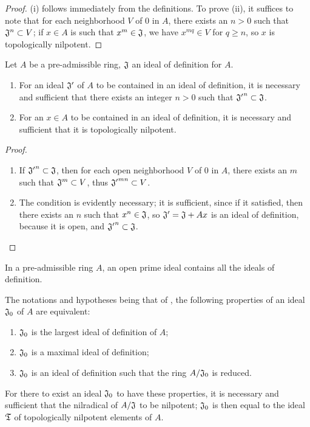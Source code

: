 \begin{proof}
\label{proof-0.7.1.3}
(i) follows immediately from the definitions. To prove (ii), it suffices to note that for
each neighborhood $V$ of $0$ in $A$, there exists an $n>0$ such that
$\mathfrak{J}^n\subset V$; if $x\in A$ is such that $x^m\in\mathfrak{J}$, we have
$x^{mq}\in V$ for $q\geqslant n$, so $x$ is topologically nilpotent.
\end{proof}

\begin{prop}[7.1.4]
\label{0.7.1.4}
Let $A$ be a pre-admissible ring, $\mathfrak{J}$ an ideal of definition for $A$.
\begin{enumerate}[label=\emph{(\roman*)}]
  \item For an ideal $\mathfrak{J}'$ of $A$ to be contained in an ideal of
    definition, it is necessary and sufficient that there exists an integer
    $n>0$ such that ${\mathfrak{J}'}^n\subset\mathfrak{J}$.
  \item For an $x\in A$ to be contained in an ideal of definition, it is
    necessary and sufficient that it is topologically nilpotent.
\end{enumerate}
\end{prop}

\begin{proof}
\label{proof-0.7.1.4}
\medskip\noindent
\begin{enumerate}[label=(\roman*)]
  \item If ${\mathfrak{J}'}^n\subset\mathfrak{J}$, then for each open neighborhood
    $V$ of $0$ in $A$, there exists an $m$ such that $\mathfrak{J}^m\subset V$, thus
    ${\mathfrak{J}'}^{mn}\subset V$.
  \item The condition is evidently necessary; it is sufficient, since if it
    satisfied, then there exists an $n$ such that $x^n\in\mathfrak{J}$, so
    $\mathfrak{J}'=\mathfrak{J}+Ax$ is an ideal of definition, because it is
    open, and ${\mathfrak{J}'}^n\subset\mathfrak{J}$.
\end{enumerate}
\end{proof}

\begin{cor}[7.1.5]
\label{0.7.1.5}
In a pre-admissible ring $A$, an open prime ideal contains all the ideals of definition.
\end{cor}

\begin{cor}[7.1.6]
\label{0.7.1.6}
The notations and hypotheses being that of , the following
properties of an ideal $\mathfrak{J}_0$ of $A$ are equivalent:
\begin{enumerate}[label=\emph{(\alph*)}]
  \item $\mathfrak{J}_0$ is the largest ideal of definition of $A$;
  \item $\mathfrak{J}_0$ is a maximal ideal of definition;
  \item $\mathfrak{J}_0$ is an ideal of definition such that the ring $A/\mathfrak{J}_0$ is reduced.
\end{enumerate}
For there to exist an ideal $\mathfrak{J}_0$ to have these properties, it is
necessary and sufficient that the nilradical of $A/\mathfrak{J}$ to be
nilpotent; $\mathfrak{J}_0$ is then equal to the ideal $\mathfrak{T}$ of
topologically nilpotent elements of $A$.
\end{cor}

